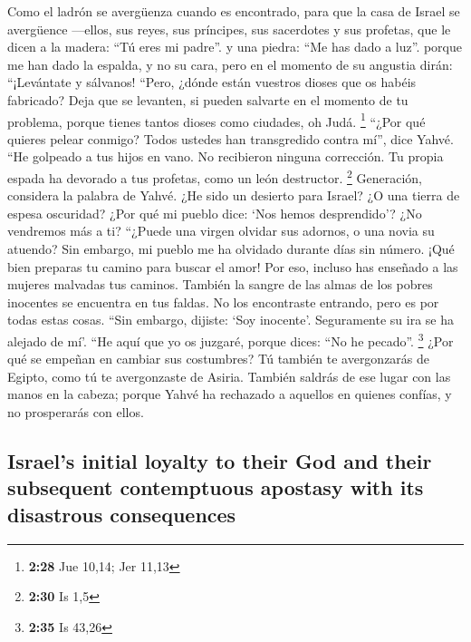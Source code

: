 \begin{paracol}{2}
 Como el ladrón se avergüenza cuando es encontrado, para
que la casa de Israel se avergüence ---ellos, sus reyes, sus príncipes,
sus sacerdotes y sus profetas,  que le dicen a la madera:
``Tú eres mi padre''. y una piedra: ``Me has dado a luz''. porque me han
dado la espalda, y no su cara, pero en el momento de su angustia dirán:
``¡Levántate y sálvanos!  ``Pero, ¿dónde están vuestros
dioses que os habéis fabricado? Deja que se levanten, si pueden salvarte
en el momento de tu problema, porque tienes tantos dioses como ciudades,
oh Judá. \footnote{\textbf{2:28} Jue 10,14; Jer 11,13} 
``¿Por qué quieres pelear conmigo? Todos ustedes han transgredido contra
mí'', dice Yahvé.  ``He golpeado a tus hijos en vano. No
recibieron ninguna corrección. Tu propia espada ha devorado a tus
profetas, como un león destructor. \footnote{\textbf{2:30} Is 1,5}
 Generación, considera la palabra de Yahvé. ¿He sido un
desierto para Israel? ¿O una tierra de espesa oscuridad? ¿Por qué mi
pueblo dice: `Nos hemos desprendido'? ¿No vendremos más a ti?
 ``¿Puede una virgen olvidar sus adornos, o una novia su
atuendo? Sin embargo, mi pueblo me ha olvidado durante días sin número.
 ¡Qué bien preparas tu camino para buscar el amor! Por
eso, incluso has enseñado a las mujeres malvadas tus caminos.
 También la sangre de las almas de los pobres inocentes
se encuentra en tus faldas. No los encontraste entrando, pero es por
todas estas cosas.  ``Sin embargo, dijiste: `Soy
inocente'. Seguramente su ira se ha alejado de mí'. ``He aquí que yo os
juzgaré, porque dices: ``No he pecado''. \footnote{\textbf{2:35} Is
  43,26}  ¿Por qué se empeñan en cambiar sus costumbres?
Tú también te avergonzarás de Egipto, como tú te avergonzaste de Asiria.
 También saldrás de ese lugar con las manos en la cabeza;
porque Yahvé ha rechazado a aquellos en quienes confías, y no
prosperarás con ellos.

\switchcolumn
\begin{otherlanguage}{english}

\hypertarget{israels-initial-loyalty-to-their-god-and-their-subsequent-contemptuous-apostasy-with-its-disastrous-consequences}{%
\subsection{Israel's initial loyalty to their God and their subsequent
contemptuous apostasy with its disastrous
consequences}\label{israels-initial-loyalty-to-their-god-and-their-subsequent-contemptuous-apostasy-with-its-disastrous-consequences}}


\end{otherlanguage}
\end{paracol}
